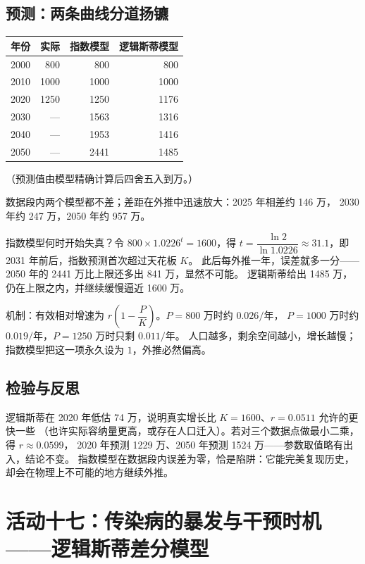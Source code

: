 \subsection{预测：两条曲线分道扬镳}
\begin{center}
\footnotesize
\setlength{\tabcolsep}{5pt}
\renewcommand{\arraystretch}{1.3}
\begin{tabular}{lrrr}
\toprule
年份 & 实际 & 指数模型 & 逻辑斯蒂模型 \\
\midrule
2000 & 800 & 800 & 800 \\
2010 & 1000 & 1000 & 1000 \\
2020 & 1250 & 1250 & 1176 \\
2030 & --- & 1563 & 1316 \\
2040 & --- & 1953 & 1416 \\
2050 & --- & 2441 & 1485 \\
\bottomrule
\end{tabular}
\end{center}
（预测值由模型精确计算后四舍五入到万。）

数据段内两个模型都不差；差距在外推中迅速放大：2025 年相差约 146 万，
2030 年约 247 万，2050 年约 957 万。

指数模型何时开始失真？令 $800\times1.0226^{t}=1600$，得
$t=\dfrac{\ln2}{\ln1.0226}\approx31.1$，即 2031 年前后，指数预测首次超过天花板 $K$。
此后每外推一年，误差就多一分——2050 年的 2441 万比上限还多出 841 万，显然不可能。
逻辑斯蒂给出 1485 万，仍在上限之内，并继续缓慢逼近 1600 万。

机制：有效相对增速为 $r\left(1-\dfrac{P}{K}\right)$。$P=800$ 万时约 $0.026/\text{年}$，
$P=1000$ 万时约 $0.019/\text{年}$，$P=1250$ 万时只剩 $0.011/\text{年}$。
人口越多，剩余空间越小，增长越慢；指数模型把这一项永久设为 $1$，外推必然偏高。

\subsection{检验与反思}
逻辑斯蒂在 2020 年低估 74 万，说明真实增长比 $K=1600$、$r=0.0511$ 允许的更快一些
（也许实际容纳量更高，或存在人口迁入）。若对三个数据点做最小二乘，得 $r\approx0.0599$，
2020 年预测 1229 万、2050 年预测 1524 万——参数取值略有出入，结论不变。
指数模型在数据段内误差为零，恰是陷阱：它能完美复现历史，却会在物理上不可能的地方继续外推。

\section{活动十七：传染病的暴发与干预时机——逻辑斯蒂差分模型}

